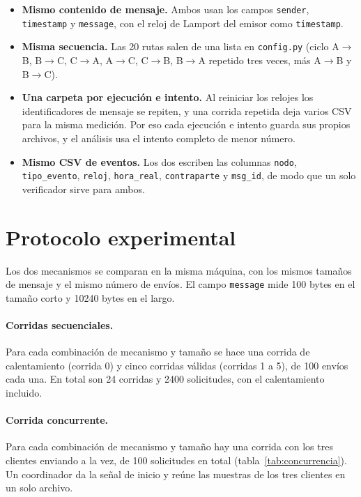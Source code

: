 \documentclass[11pt,a4paper]{article}
\begin{document}
\begin{itemize}
  \item \textbf{Mismo contenido de mensaje.} Ambos usan los campos \texttt{sender},
        \texttt{timestamp} y \texttt{message}, con el reloj de Lamport del emisor como
        \texttt{timestamp}.
  \item \textbf{Misma secuencia.} Las 20 rutas salen de una lista en \texttt{config.py}
        (ciclo A$\to$B, B$\to$C, C$\to$A, A$\to$C, C$\to$B, B$\to$A repetido tres veces,
        más A$\to$B y B$\to$C).
  \item \textbf{Una carpeta por ejecución e intento.} Al reiniciar los relojes los
        identificadores de mensaje se repiten, y una corrida repetida deja varios CSV para la
        misma medición. Por eso cada ejecución e intento guarda sus propios archivos, y el
        análisis usa el intento completo de menor número.
  \item \textbf{Mismo CSV de eventos.} Los dos escriben las columnas \texttt{nodo},
        \texttt{tipo\_evento}, \texttt{reloj}, \texttt{hora\_real}, \texttt{contraparte} y
        \texttt{msg\_id}, de modo que un solo verificador sirve para ambos.
\end{itemize}

\section{Protocolo experimental}

Los dos mecanismos se comparan en la misma máquina, con los mismos tamaños de mensaje y
el mismo número de envíos. El campo \texttt{message} mide 100 bytes en el tamaño corto y
10240 bytes en el largo.

\paragraph{Corridas secuenciales.} Para cada combinación de mecanismo y tamaño se hace una
corrida de calentamiento (corrida 0) y cinco corridas válidas (corridas 1 a 5), de 100
envíos cada una. En total son 24 corridas y 2400 solicitudes, con el calentamiento
incluido.

\paragraph{Corrida concurrente.} Para cada combinación de mecanismo y tamaño hay una
corrida con los tres clientes enviando a la vez, de 100 solicitudes en total
(tabla~\ref{tab:concurrencia}). Un coordinador da la señal de inicio y reúne las muestras
de los tres clientes en un solo archivo.
\end{document}
